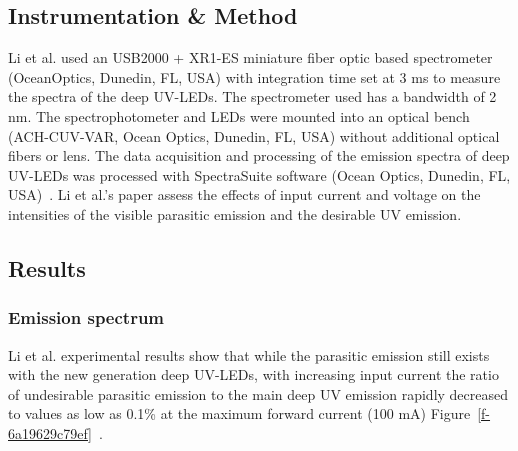 \documentclass[11pt]{article}
\begin{document}
\subsection{Instrumentation \& Method}Li et al. used an USB2000 + XR1-ES miniature fiber optic based spectrometer (OceanOptics, Dunedin, FL, USA) with integration time set at 3 ms to measure the spectra of the deep UV-LEDs. The spectrometer used has a bandwidth of 2 nm. The spectrophotometer and LEDs were mounted into an optical bench (ACH-CUV-VAR, Ocean Optics, Dunedin, FL, USA) without additional optical fibers or lens. The data acquisition and processing of the emission spectra of deep UV-LEDs was processed with SpectraSuite software (Ocean Optics, Dunedin, FL, USA)\unskip~\cite{693772:16459460}. Li et al.'s paper assess the effects of input current and voltage on the intensities of the visible parasitic emission and the desirable UV emission. 



\subsection{Results}



\subsubsection{Emission spectrum}Li et al. experimental results show that while the parasitic emission still exists with the new generation deep UV-LEDs, with increasing input current the ratio of undesirable parasitic emission to the main deep UV emission rapidly decreased to values as low as 0.1\% at the maximum forward current (100 mA) Figure~\ref{f-6a19629c79ef}\unskip~\cite{693772:16459460}.
\end{document}
